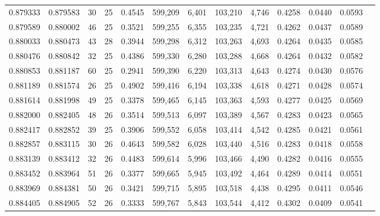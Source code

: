 \begin{tabular}{rrrrrrrrrrrrr}
0.879333 & 0.879583 &    30 &  25 &                                     0.4545 & 599,209 &   6,401 & 103,210 &   4,746 & 0.4258 & 0.0440 & 0.0593 \\
0.879589 & 0.880002 &    46 &  25 &                                     0.3521 & 599,255 &   6,355 & 103,235 &   4,721 & 0.4262 & 0.0437 & 0.0589 \\
0.880033 & 0.880473 &    43 &  28 &                                     0.3944 & 599,298 &   6,312 & 103,263 &   4,693 & 0.4264 & 0.0435 & 0.0585 \\
0.880476 & 0.880842 &    32 &  25 &                                     0.4386 & 599,330 &   6,280 & 103,288 &   4,668 & 0.4264 & 0.0432 & 0.0582 \\
0.880853 & 0.881187 &    60 &  25 &                                     0.2941 & 599,390 &   6,220 & 103,313 &   4,643 & 0.4274 & 0.0430 & 0.0576 \\
0.881189 & 0.881574 &    26 &  25 &                                     0.4902 & 599,416 &   6,194 & 103,338 &   4,618 & 0.4271 & 0.0428 & 0.0574 \\
0.881614 & 0.881998 &    49 &  25 &                                     0.3378 & 599,465 &   6,145 & 103,363 &   4,593 & 0.4277 & 0.0425 & 0.0569 \\
0.882000 & 0.882405 &    48 &  26 &                                     0.3514 & 599,513 &   6,097 & 103,389 &   4,567 & 0.4283 & 0.0423 & 0.0565 \\
0.882417 & 0.882852 &    39 &  25 &                                     0.3906 & 599,552 &   6,058 & 103,414 &   4,542 & 0.4285 & 0.0421 & 0.0561 \\
0.882857 & 0.883115 &    30 &  26 &                                     0.4643 & 599,582 &   6,028 & 103,440 &   4,516 & 0.4283 & 0.0418 & 0.0558 \\
0.883139 & 0.883412 &    32 &  26 &                                     0.4483 & 599,614 &   5,996 & 103,466 &   4,490 & 0.4282 & 0.0416 & 0.0555 \\
0.883452 & 0.883964 &    51 &  26 &                                     0.3377 & 599,665 &   5,945 & 103,492 &   4,464 & 0.4289 & 0.0414 & 0.0551 \\
0.883969 & 0.884381 &    50 &  26 &                                     0.3421 & 599,715 &   5,895 & 103,518 &   4,438 & 0.4295 & 0.0411 & 0.0546 \\
0.884405 & 0.884905 &    52 &  26 &                                     0.3333 & 599,767 &   5,843 & 103,544 &   4,412 & 0.4302 & 0.0409 & 0.0541 \\

\end{tabular}
